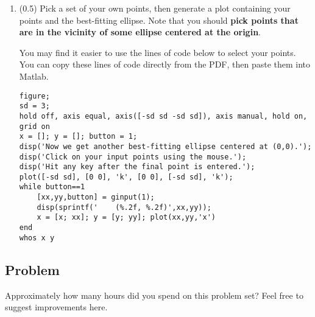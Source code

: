 \documentclass[11pt,titlepage,fleqn]{article}
\begin{document}
\begin{enumerate}
\begin{enumerate}

\item Check that the result is the same as if you simply use the ``\verb+\+'' command: \verb+m = G\d+.

\item Produce a plot showing both the data and the best-fitting ellipse.

\end{enumerate}


\item (0.5) Pick a set of your own points, then generate a plot containing your points and the best-fitting ellipse. Note that you should {\bf pick points that are in the vicinity of some ellipse centered at the origin}.

You may find it easier to use the lines of code below to select your points. You can copy these lines of code directly from the PDF, then paste them into Matlab.

\small
\begin{spacing}{1.0}
\begin{verbatim}
figure;
sd = 3;
hold off, axis equal, axis([-sd sd -sd sd]), axis manual, hold on, grid on
x = []; y = []; button = 1;
disp('Now we get another best-fitting ellipse centered at (0,0).');
disp('Click on your input points using the mouse.');
disp('Hit any key after the final point is entered.');
plot([-sd sd], [0 0], 'k', [0 0], [-sd sd], 'k');
while button==1
    [xx,yy,button] = ginput(1);
    disp(sprintf('    (%.2f, %.2f)',xx,yy));
    x = [x; xx]; y = [y; yy]; plot(xx,yy,'x')
end
whos x y
\end{verbatim}
\end{spacing}

\end{enumerate}


\subsection*{Problem}

Approximately how many hours did you spend on this problem set? Feel free to suggest improvements here.




\end{document}
